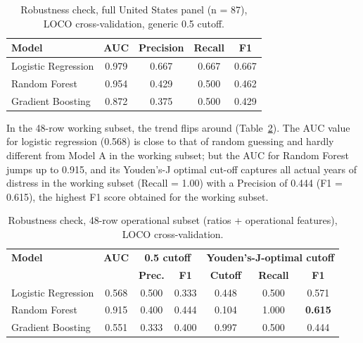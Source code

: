 \documentclass[final,1p,times]{elsarticle}
\begin{document}
\begin{table}[h]
\centering
\small
\caption{Robustness check, full United States panel (n = 87), LOCO cross-validation, generic 0.5 cutoff.}
\label{tab:robustness-full}
\begin{tabular}{lcccc}
\toprule
\textbf{Model} & \textbf{AUC} & \textbf{Precision} & \textbf{Recall} & \textbf{F1} \\
\midrule
Logistic Regression & 0.979 & 0.667 & 0.667 & 0.667 \\
Random Forest & 0.954 & 0.429 & 0.500 & 0.462 \\
Gradient Boosting & 0.872 & 0.375 & 0.500 & 0.429 \\
\bottomrule
\end{tabular}
\end{table}

In the 48-row working subset, the trend flips around (Table~\ref{tab:robustness-op}). The AUC value for logistic regression (0.568) is close to that of random guessing and hardly different from Model A in the working subset; but the AUC for Random Forest jumps up to 0.915, and its Youden's-J optimal cut-off captures all actual years of distress in the working subset (Recall = 1.00) with a Precision of 0.444 (F1 = 0.615), the highest F1 score obtained for the working subset.

\begin{table}[h]
\centering
\small
\caption{Robustness check, 48-row operational subset (ratios + operational features), LOCO cross-validation.}
\label{tab:robustness-op}
\begin{tabular}{lcccccc}
\toprule
\textbf{Model} & \textbf{AUC} & \multicolumn{2}{c}{\textbf{0.5 cutoff}} & \multicolumn{3}{c}{\textbf{Youden's-J-optimal cutoff}} \\
 & & \textbf{Prec.} & \textbf{F1} & \textbf{Cutoff} & \textbf{Recall} & \textbf{F1} \\
\midrule
Logistic Regression & 0.568 & 0.500 & 0.333 & 0.448 & 0.500 & 0.571 \\
Random Forest & 0.915 & 0.400 & 0.444 & 0.104 & 1.000 & \textbf{0.615} \\
Gradient Boosting & 0.551 & 0.333 & 0.400 & 0.997 & 0.500 & 0.444 \\
\bottomrule
\end{tabular}
\end{table}
\end{document}
